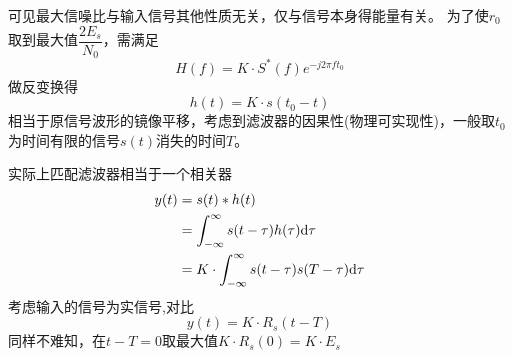     可见最大信噪比与输入信号其他性质无关，仅与信号本身得能量有关。
    为了使$r_0$取到最大值$\dfrac{2E_s}{N_0}$，需满足
    \begin{equation}
        H(f)=K\cdot S^*(f)e^{-j2\pi ft_0}
    \end{equation}
    做反变换得
    \begin{equation}
        h(t)=K\cdot s(t_0-t)
    \end{equation}
    相当于原信号波形的镜像平移，考虑到滤波器的因果性(物理可实现性)，一般取$t_0$为时间有限的信号$s(t)$消失的时间$T$。
    
    实际上匹配滤波器相当于一个相关器
    \begin{equation}
        \begin{split}
            y(t)&=s(t)*h(t)\\
                &=\int_{-\infty}^{\infty}s(t-\tau)h(\tau)\text{\upshape d} \tau\\
                &=K\cdot\int_{-\infty}^{\infty}s(t-\tau)s(T-\tau)\text{\upshape d} \tau
        \end{split}
    \end{equation}
    考虑输入的信号为实信号,对比
    \begin{equation}
        y(t)=K\cdot R_s(t-T)
    \end{equation}
    同样不难知，在$t-T=0$取最大值$K\cdot R_s(0)=K\cdot E_s$


    

